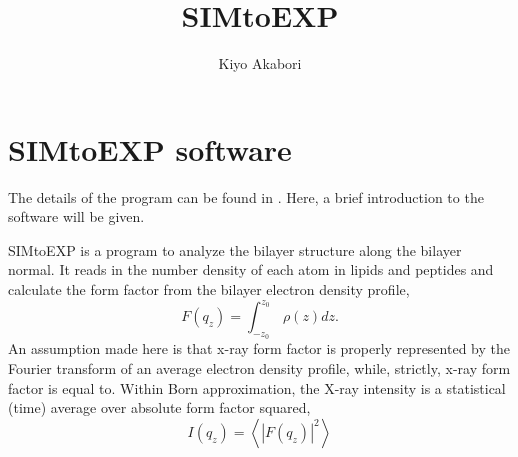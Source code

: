 \documentclass[letterpaper,12pt]{article}
\author{Kiyo Akabori}
\title{SIMtoEXP}
\begin{document}



\section{SIMtoEXP software}
The details of the program can be found in \cite{ref:Kucerka10}. Here, a brief
introduction to the software will be given.

SIMtoEXP is a program to analyze the bilayer structure along the bilayer normal.
It reads in the number density of each atom in lipids and peptides and calculate
the form factor from the bilayer electron density profile,
\begin{equation}
  F(q_z) = \int_{-z_0}^{z_0} \, \rho(z) dz.
\end{equation}
An assumption made here is that x-ray form factor is properly represented by 
the Fourier transform of an average electron density profile, while, strictly,
x-ray form factor is equal to.
Within Born approximation, the X-ray intensity is a statistical (time) average 
over absolute form factor squared,
\begin{equation}
  I(q_z) = \left< |F(q_z)|^2 \right>
\end{equation}
\end{document}
